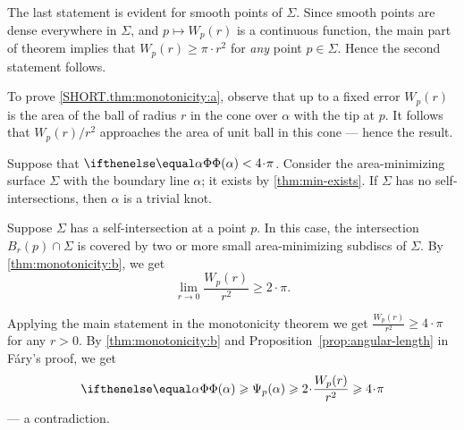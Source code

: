 The last statement is evident for smooth points of $\Sigma$.
Since smooth points are dense everywhere in $\Sigma$, and $p\mapsto W_p(r)$ is a continuous function,
the main part of theorem implies that $W_p(r)\ge\pi\cdot r^2$ for \emph{any} point $p\in\Sigma$.
Hence the second statement follows.

To prove \ref{SHORT.thm:monotonicity:a}, observe that up to a fixed error $W_p(r)$ is the area of the ball of radius $r$ in the cone over $\alpha$ with the tip at $p$.
It follows that $W_p(r)/r^2$ approaches the area of unit ball in this cone --- hence the result.
\qeds

Suppose that $\tc\alpha<4\cdot\pi$.
Consider the area-minimizing surface $\Sigma$ with the boundary line $\alpha$; it exists by \ref{thm:min-exists}.
If $\Sigma$ has no self-intersections, then $\alpha$ is a trivial knot.

Suppose $\Sigma$ has a self-intersection at a point $p$.
In this case, the intersection $B_r(p)\cap \Sigma$ is covered by two or more small area-minimizing subdiscs of $\Sigma$.
By \ref{thm:monotonicity:b}, we get 
\[\lim_{r\to0}\frac{W_p(r)}{r^2}\ge 2\cdot\pi.\]

Applying the main statement in the monotonicity theorem we get $\frac{W_p(r)}{r^2}\ge 4\cdot\pi$ for any $r>0$.
By \ref{thm:monotonicity:b} and Proposition~\ref{prop:angular-length} in F\'ary's proof, we get
\[\tc{\alpha}\ge \Psi_p(\alpha)\ge 2\cdot \frac{W_p(r)}{r^2}\ge 4\cdot\pi\]
--- a contradiction.
\qeds


